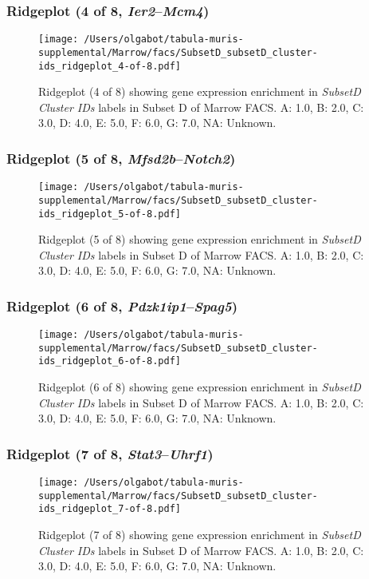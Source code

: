 \clearpage

\subsubsection{Ridgeplot (4 of 8, \emph{Ier2}--\emph{Mcm4})}
\begin{figure}[h]
\centering
\texttt{[image: /Users/olgabot/tabula-muris-supplemental/Marrow/facs/SubsetD\_subsetD\_cluster-ids\_ridgeplot\_4-of-8.pdf]}

\caption{ Ridgeplot (4 of 8)  showing gene expression enrichment in \emph{SubsetD Cluster IDs} labels in Subset D of Marrow FACS. A: 1.0, B: 2.0, C: 3.0, D: 4.0, E: 5.0, F: 6.0, G: 7.0, NA: Unknown.}
\end{figure}


\clearpage

\subsubsection{Ridgeplot (5 of 8, \emph{Mfsd2b}--\emph{Notch2})}
\begin{figure}[h]
\centering
\texttt{[image: /Users/olgabot/tabula-muris-supplemental/Marrow/facs/SubsetD\_subsetD\_cluster-ids\_ridgeplot\_5-of-8.pdf]}

\caption{ Ridgeplot (5 of 8)  showing gene expression enrichment in \emph{SubsetD Cluster IDs} labels in Subset D of Marrow FACS. A: 1.0, B: 2.0, C: 3.0, D: 4.0, E: 5.0, F: 6.0, G: 7.0, NA: Unknown.}
\end{figure}


\clearpage

\subsubsection{Ridgeplot (6 of 8, \emph{Pdzk1ip1}--\emph{Spag5})}
\begin{figure}[h]
\centering
\texttt{[image: /Users/olgabot/tabula-muris-supplemental/Marrow/facs/SubsetD\_subsetD\_cluster-ids\_ridgeplot\_6-of-8.pdf]}

\caption{ Ridgeplot (6 of 8)  showing gene expression enrichment in \emph{SubsetD Cluster IDs} labels in Subset D of Marrow FACS. A: 1.0, B: 2.0, C: 3.0, D: 4.0, E: 5.0, F: 6.0, G: 7.0, NA: Unknown.}
\end{figure}


\clearpage

\subsubsection{Ridgeplot (7 of 8, \emph{Stat3}--\emph{Uhrf1})}
\begin{figure}[h]
\centering
\texttt{[image: /Users/olgabot/tabula-muris-supplemental/Marrow/facs/SubsetD\_subsetD\_cluster-ids\_ridgeplot\_7-of-8.pdf]}

\caption{ Ridgeplot (7 of 8)  showing gene expression enrichment in \emph{SubsetD Cluster IDs} labels in Subset D of Marrow FACS. A: 1.0, B: 2.0, C: 3.0, D: 4.0, E: 5.0, F: 6.0, G: 7.0, NA: Unknown.}
\end{figure}



